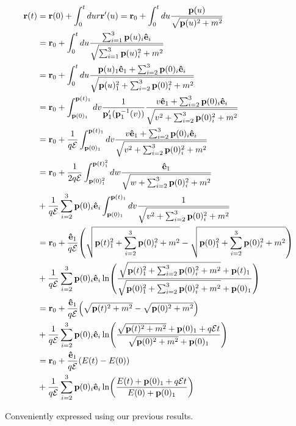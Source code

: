 \documentclass{article}
\begin{document}
\begin{align}
\begin{split}
\vb{r}(t)&=\vb{r}(0)+\int_0^t du r\vb{r}'(u)=\vb{r}_0+\int_0^t du \frac{\vb{p}(u)}{\sqrt{\vb{p}(u)^2+m^2}}\\
&=\vb{r}_0+\int_0^t du \frac{\sum_{i=1}^3\vb{p}(u)_i\vu
{e}_i}{\sqrt{\sum_{i=1}^3\vb{p}(u)_i^2+m^2}}\\
&=\vb{r}_0+\int_0^t du \frac{\vb{p}(u)_1\vu{e}_1+\sum_{i=2}^3\vb{p}(0)_i\vu{e}_i}{\sqrt{\vb{p}(u)_1^2+\sum_{i=2}^3\vb{p}(0)_i^2+m^2}}\\
&=\vb{r}_0+\int_{\vb{p}(0)_1}^{\vb{p}(t)_1} dv \frac{1}{\vb{p}_1'(\vb{p}_1^{-1}(v))}\frac{v\vu{e}_1+\sum_{i=2}^3\vb{p}(0)_i\vu{e}_i}{\sqrt{v^2+\sum_{i=2}^3\vb{p}(0)_i^2+m^2}}\\
&=\vb{r}_0+\frac{1}{q\mathcal{E}}\int_{\vb{p}(0)_1}^{\vb{p}(t)_1} dv \frac{v\vu{e}_1+\sum_{i=2}^3\vb{p}(0)_i\vu{e}_i}{\sqrt{v^2+\sum_{i=2}^3\vb{p}(0)_i^2+m^2}}\\
&=\vb{r}_0+\frac{1}{2q\mathcal{E}}\int_{\vb{p}(0)_1^2}^{\vb{p}(t)_1^2} dw \frac{\vu{e}_1}{\sqrt{w+\sum_{i=2}^3\vb{p}(0)_i^2+m^2}}\\
&+\frac{1}{q\mathcal{E}}\sum_{i=2}^3\vb{p}(0)_i\vu{e}_i\int_{\vb{p}(0)_1}^{\vb{p}(t)_1} dv \frac{1}{\sqrt{v^2+\sum_{i=2}^3\vb{p}(0)_i^2+m^2}}\\
&=\vb{r}_0+\frac{\vu{e}_1}{q\mathcal{E}}\qty(\sqrt{\vb{p}(t)_1^2+\sum_{i=2}^3\vb{p}(0)_i^2+m^2}-\sqrt{\vb{p}(0)^2_1+\sum_{i=2}^3\vb{p}(0)_i^2+m^2})\\
&+\frac{1}{q\mathcal{E}}\sum_{i=2}^3\vb{p}(0)_i\vu{e}_i\ln(\frac{\sqrt{\vb{p}(t)_1^2+\sum_{i=2}^3\vb{p}(0)_i^2+m^2}+\vb{p}(t)_1}{\sqrt{\vb{p}(0)_1^2+\sum_{i=2}^3\vb{p}(0)_i^2+m^2}+\vb{p}(0)_1})\\
&=\vb{r}_0+\frac{\vu{e}_1}{q\mathcal{E}}\qty(\sqrt{\vb{p}(t)^2+m^2}-\sqrt{\vb{p}(0)^2+m^2})\\
&+\frac{1}{q\mathcal{E}}\sum_{i=2}^3\vb{p}(0)_i\vu{e}_i\ln(\frac{\sqrt{\vb{p}(t)^2+m^2}+\vb{p}(0)_1+q\mathcal{E}t}{\sqrt{\vb{p}(0)^2+m^2}+\vb{p}(0)_1})\\
&=\vb{r}_0+\frac{\vu{e}_1}{q\mathcal{E}}\qty(E(t)-E(0))\\
&+\frac{1}{q\mathcal{E}}\sum_{i=2}^3\vb{p}(0)_i\vu{e}_i\ln(\frac{E(t)+\vb{p}(0)_1+q\mathcal{E}t}{E(0)+\vb{p}(0)_1})\\
\end{split}
\end{align}

Conveniently expressed using our previous results.
\end{document}
